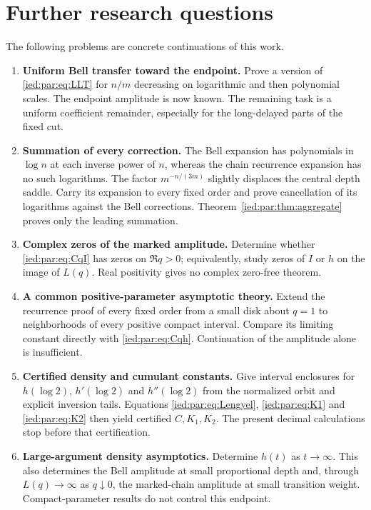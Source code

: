 \documentclass[11pt,letterpaper]{article}
\theoremstyle{remark}\newtheorem{remark}[theorem]{Remark}
\begin{document}
\section{Further research questions}\label{ied:par:sec:further}
The following problems are concrete continuations of this work.
\begin{enumerate}[leftmargin=*,itemsep=5pt]
\item\label{ied:par:q:uniform} \textbf{Uniform Bell transfer toward the endpoint.}
Prove a version of \eqref{ied:par:eq:LLT} for $n/m$ decreasing on logarithmic
and then polynomial scales. The endpoint amplitude is now known.
The remaining task is a uniform coefficient remainder, especially
for the long-delayed parts of the fixed cut.

\item\label{ied:par:q:summation} \textbf{Summation of every correction.}
The Bell expansion has polynomials in $\log n$ at each inverse power
of $n$, whereas the chain recurrence expansion has no such logarithms.
The factor $m^{-n/(3m)}$ slightly displaces the central depth saddle.
Carry its expansion to every fixed order and prove cancellation of
its logarithms against the Bell corrections.
Theorem~\ref{ied:par:thm:aggregate} proves only the leading summation.

\item\label{ied:par:q:zeros} \textbf{Complex zeros of the marked amplitude.}
Determine whether \eqref{ied:par:eq:CqI} has zeros on $\Re q>0$; equivalently,
study zeros of $I$ or $h$ on the image of $L(q)$.
Real positivity gives no complex zero-free theorem.

\item\label{ied:par:q:positive} \textbf{A common positive-parameter asymptotic theory.}
Extend the recurrence proof of every fixed order from a small disk
about $q=1$ to neighborhoods of every positive compact interval.
Compare its limiting constant directly with \eqref{ied:par:eq:Cqh}.
Continuation of the amplitude alone is insufficient.

\item\label{ied:par:q:certified} \textbf{Certified density and cumulant constants.}
Give interval enclosures for $h(\log2)$, $h'(\log2)$ and
$h''(\log2)$ from the normalized orbit and explicit inversion tails.
Equations \eqref{ied:par:eq:Lengyel}, \eqref{ied:par:eq:K1} and \eqref{ied:par:eq:K2} then
yield certified $C,K_1,K_2$. The present decimal calculations stop
before that certification.

\item\label{ied:par:q:large} \textbf{Large-argument density asymptotics.}
Determine $h(t)$ as $t\to\infty$. This also determines the Bell
amplitude at small proportional depth and, through $L(q)\to\infty$
as $q\downarrow0$, the marked-chain amplitude at small transition
weight. Compact-parameter results do not control this endpoint.


\end{enumerate}
\end{document}
